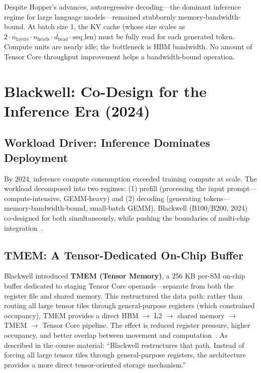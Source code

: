 \documentclass[10pt,twocolumn]{article}
\begin{document}
Despite Hopper's advances, autoregressive decoding—the dominant inference regime for large language models—remained stubbornly memory-bandwidth-bound. At batch size 1, the KV cache (whose size scales as $2 \cdot n_{\text{layers}} \cdot n_{\text{heads}} \cdot d_{\text{head}} \cdot \text{seq\_len}$) must be fully read for each generated token. Compute units are nearly idle; the bottleneck is HBM bandwidth. No amount of Tensor Core throughput improvement helps a bandwidth-bound operation.

\section{Blackwell: Co-Design for the Inference Era (2024)}
\label{sec:blackwell}

\subsection{Workload Driver: Inference Dominates Deployment}

By 2024, inference compute consumption exceeded training compute at scale. The workload decomposed into two regimes: (1) prefill (processing the input prompt—compute-intensive, GEMM-heavy) and (2) decoding (generating tokens—memory-bandwidth-bound, small-batch GEMM). Blackwell (B100/B200, 2024) co-designed for both simultaneously, while pushing the boundaries of multi-chip integration~\citep{nvidia2024blackwell}.

\subsection{TMEM: A Tensor-Dedicated On-Chip Buffer}

Blackwell introduced \textbf{TMEM (Tensor Memory)}, a 256 KB per-SM on-chip buffer dedicated to staging Tensor Core operands—separate from both the register file and shared memory. This restructured the data path: rather than routing all large tensor tiles through general-purpose registers (which constrained occupancy), TMEM provides a direct HBM $\to$ L2 $\to$ shared memory $\to$ TMEM $\to$ Tensor Core pipeline. The effect is reduced register pressure, higher occupancy, and better overlap between movement and computation~\citep{nvidia2024blackwell}. As described in the course material: ``Blackwell restructures that path. Instead of forcing all large tensor tiles through general-purpose registers, the architecture provides a more direct tensor-oriented storage mechanism.''
\end{document}
